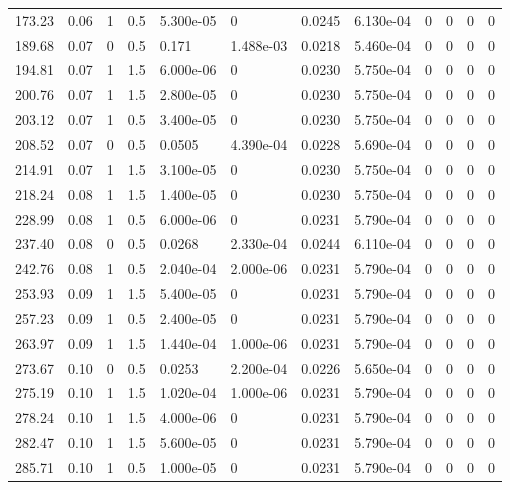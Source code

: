 \documentclass[preview]{standalone}
\begin{document}
{{{\begin{tabular}{L{1.2cm}C{1.2cm} C{0.3cm}C{0.5cm} C{1.4cm}C{1.4cm} C{1.4cm}C{1.4cm} C{1.6cm}C{1.6cm} C{1.6cm}C{1.6cm}}
  173.23  &  0.06  & 1     & 0.5 &  5.300e-05  & 0  &  0.0245&   6.130e-04& 0 & 0   &  0 & 0  \\ 
  189.68  &  0.07  & 0     & 0.5 &  0.171  & 1.488e-03  &  0.0218&   5.460e-04& 0 & 0   &  0 & 0  \\ 
  194.81  &  0.07  & 1     & 1.5 &  6.000e-06  & 0  &  0.0230&   5.750e-04& 0 & 0   &  0 & 0  \\ 
  200.76  &  0.07  & 1     & 1.5 &  2.800e-05  & 0  &  0.0230&   5.750e-04& 0 & 0   &  0 & 0  \\ 
  203.12  &  0.07  & 1     & 0.5 &  3.400e-05  & 0  &  0.0230&   5.750e-04& 0 & 0   &  0 & 0  \\ 
  208.52  &  0.07  & 0     & 0.5 &  0.0505  & 4.390e-04  &  0.0228&   5.690e-04& 0 & 0   &  0 & 0  \\ 
  214.91  &  0.07  & 1     & 1.5 &  3.100e-05  & 0  &  0.0230&   5.750e-04& 0 & 0   &  0 & 0  \\ 
  218.24  &  0.08  & 1     & 1.5 &  1.400e-05  & 0  &  0.0230&   5.750e-04& 0 & 0   &  0 & 0  \\ 
  228.99  &  0.08  & 1     & 0.5 &  6.000e-06  & 0  &  0.0231&   5.790e-04& 0 & 0   &  0 & 0  \\ 
  237.40  &  0.08  & 0     & 0.5 &  0.0268  & 2.330e-04  &  0.0244&   6.110e-04& 0 & 0   &  0 & 0  \\ 
  242.76  &  0.08  & 1     & 0.5 &  2.040e-04  & 2.000e-06  &  0.0231&   5.790e-04& 0 & 0   &  0 & 0  \\ 
  253.93  &  0.09  & 1     & 1.5 &  5.400e-05  & 0  &  0.0231&   5.790e-04& 0 & 0   &  0 & 0  \\ 
  257.23  &  0.09  & 1     & 0.5 &  2.400e-05  & 0  &  0.0231&   5.790e-04& 0 & 0   &  0 & 0  \\ 
  263.97  &  0.09  & 1     & 1.5 &  1.440e-04  & 1.000e-06  &  0.0231&   5.790e-04& 0 & 0   &  0 & 0  \\ 
  273.67  &  0.10  & 0     & 0.5 &  0.0253  & 2.200e-04  &  0.0226&   5.650e-04& 0 & 0   &  0 & 0  \\ 
  275.19  &  0.10  & 1     & 1.5 &  1.020e-04  & 1.000e-06  &  0.0231&   5.790e-04& 0 & 0   &  0 & 0  \\ 
  278.24  &  0.10  & 1     & 1.5 &  4.000e-06  & 0  &  0.0231&   5.790e-04& 0 & 0   &  0 & 0  \\ 
  282.47  &  0.10  & 1     & 1.5 &  5.600e-05  & 0  &  0.0231&   5.790e-04& 0 & 0   &  0 & 0  \\ 
  285.71  &  0.10  & 1     & 0.5 &  1.000e-05  & 0  &  0.0231&   5.790e-04& 0 & 0   &  0 & 0  \\ 

\end{tabular}}}}
\end{document}
